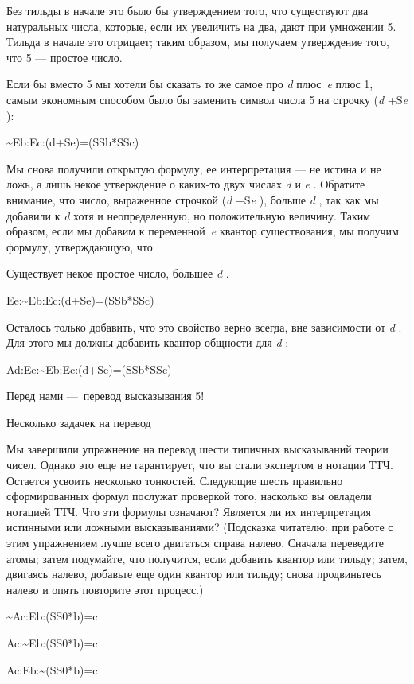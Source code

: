 \documentclass[../main.tex]{subfiles}
\begin{document}
Без тильды в начале это было бы утверждением того, что существуют два натуральных числа, которые, если их увеличить на два, дают при умножении 5. Тильда в начале это отрицает; таким образом, мы получаем утверждение того, что 5 --- простое число.

Если бы вместо 5 мы хотели бы сказать то же самое про \emph{d} плюс~\emph{e} плюс 1, самым экономным способом было бы заменить символ числа 5 на строчку (\emph{d} +S\emph{e} ):

\textasciitilde Eb:Ec:(d+Se)=(SSb*SSc)

Мы снова получили открытую формулу; ее интерпретация --- не истина и не ложь, а лишь некое утверждение о каких-то двух числах \emph{d} и \emph{e} . Обратите внимание, что число, выраженное строчкой (\emph{d} +S\emph{e} ), больше \emph{d} , так как мы добавили к \emph{d} хотя и неопределенную, но положительную величину. Таким образом, если мы добавим к переменной~\emph{e} квантор существования, мы получим формулу, утверждающую, что

Существует некое простое число, большее \emph{d} .

Ee:\textasciitilde Eb:Ec:(d+Se)=(SSb*SSc)

Осталось только добавить, что это свойство верно всегда, вне зависимости от \emph{d} . Для этого мы должны добавить квантор общности для \emph{d} :

Ad:Ee:\textasciitilde Eb:Ec:(d+Se)=(SSb*SSc)

Перед нами ---~перевод высказывания 5!

Несколько задачек на перевод

Мы завершили упражнение на перевод шести типичных высказываний теории чисел. Однако это еще не гарантирует, что вы стали экспертом в нотации ТТЧ. Остается усвоить несколько тонкостей. Следующие шесть правильно сформированных формул послужат проверкой того, насколько вы овладели нотацией ТТЧ. Что эти формулы означают? Является ли их интерпретация истинными или ложными высказываниями? (Подсказка читателю: при работе с этим упражнением лучше всего двигаться справа налево. Сначала переведите атомы; затем подумайте, что получится, если добавить квантор или тильду; затем, двигаясь налево, добавьте еще один квантор или тильду; снова продвиньтесь налево и опять повторите этот процесс.)

\textasciitilde Ac:Eb:(SS0*b)=c

Ac:\textasciitilde Eb:(SS0*b)=c

Ac:Eb:\textasciitilde(SS0*b)=c
\end{document}
